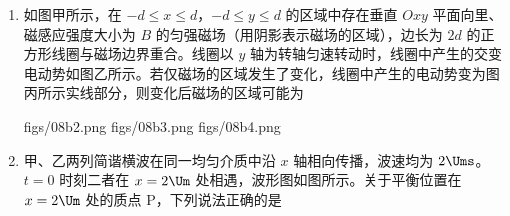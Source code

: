 \documentclass[\gkver]{gaokaozhenti}
\begin{document}
\begin{enumerate}
{解得弹性绳的伸长量 $x_{0}=\frac{\mu mg}{k}$

则此时弹性绳的弹性势能为

$E_{0}=\frac{1}{2}kx_{0}^{2}=\frac{\mu^{2}m^{2}g^{2}}{2k}$

从开始拉动乙所坐木板到甲所坐木板刚要离开原位置的过程，乙所坐木板的位移为 $x_{1}=x_{0}+l-d$

则由功能关系可知该过程 $F$ 所做的功

$W = E_{0} + \mu mgx_{1} = \frac{3(\mu mg)^{2}}{2k} + \mu mg(l - d)$

故选 B。
}

\item
如图甲所示，在 $- d \le x \le d$，$- d \le y \le d$ 的区域中存在垂直 $Oxy$ 平面向里、磁感应强度大小为 $B$ 的匀强磁场（用阴影表示磁场的区域），边长为 $2d$ 的正方形线圈与磁场边界重合。线圈以 $y$ 轴为转轴匀速转动时，线圈中产生的交变电动势如图乙所示。若仅磁场的区域发生了变化，线圈中产生的电动势变为图丙所示实线部分，则变化后磁场的区域可能为


{figs/08b2.png}
{figs/08b3.png}
{figs/08b4.png}


\item
甲、乙两列简谐横波在同一均匀介质中沿 $x$ 轴相向传播，波速均为 $2 \Ums$。$t = 0$ 时刻二者在 $x = 2 \Um$ 处相遇，波形图如图所示。关于平衡位置在 $x = 2 \Um$ 处的质点 P，下列说法正确的是



\end{enumerate}
\end{document}
